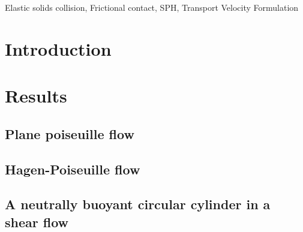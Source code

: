 \documentclass[preprint,12pt]{elsarticle}
\begin{document}
\begin{frontmatter}

  \title{}
  \author[IITB]{Dinesh Adepu}
  \author[XXX]{Pawan Negi }
  \author[University of Surrey]{Chuan Yu Wu}
\address[UoS]{Department of Aerospace Engineering, Indian Institute of
  Technology Bombay, Powai, Mumbai 400076}



\begin{abstract}

\end{abstract}

\begin{keyword}
{Elastic solids collision}, {Frictional contact}, {SPH}, {Transport Velocity Formulation}


\end{keyword}

\end{frontmatter}


\section{Introduction}
\label{sec:intro}



\FloatBarrier%
\section{Results}
\label{sec:results}


\FloatBarrier%
\subsection{Plane poiseuille flow}
\label{sec:res:ppf}


\FloatBarrier%
\subsection{Hagen-Poiseuille flow}
\label{sec:res:hpf}



\FloatBarrier%
\subsection{A neutrally buoyant circular cylinder in a shear ﬂow}
\label{sec:res:hpf}
\end{document}
